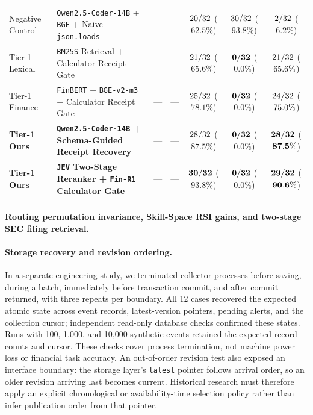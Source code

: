 \begin{table}[t]
{\begin{tabular}{@{}llccccc@{}}
Negative Control & \texttt{Qwen2.5-Coder-14B} + \texttt{BGE} + Naive \texttt{json.loads} & --- & --- & $20/32$ ($62.5\%$) & $30/32$ ($93.8\%$) & $2/32$ ($6.2\%$) \\
Tier-1 Lexical & \texttt{BM25S} Retrieval + Calculator Receipt Gate & --- & --- & $21/32$ ($65.6\%$) & $\mathbf{0/32}$ ($\mathbf{0.0\%}$) & $21/32$ ($65.6\%$) \\
Tier-1 Finance & \texttt{FinBERT} + \texttt{BGE-v2-m3} + Calculator Receipt Gate & --- & --- & $25/32$ ($78.1\%$) & $\mathbf{0/32}$ ($\mathbf{0.0\%}$) & $24/32$ ($75.0\%$) \\
\textbf{Tier-1 Ours} & \textbf{\texttt{Qwen2.5-Coder-14B} + Schema-Guided Receipt Recovery} & --- & --- & $28/32$ ($87.5\%$) & $\mathbf{0/32}$ ($\mathbf{0.0\%}$) & $\mathbf{28/32}$ ($\mathbf{87.5\%}$) \\
\textbf{Tier-1 Ours} & \textbf{\texttt{JEV} Two-Stage Reranker + \texttt{Fin-R1} Calculator Gate} & --- & --- & $\mathbf{30/32}$ ($\mathbf{93.8\%}$) & $\mathbf{0/32}$ ($\mathbf{0.0\%}$) & $\mathbf{29/32}$ ($\mathbf{90.6\%}$) \\
\bottomrule
\end{tabular}%
}
\end{table}

\paragraph{Routing permutation invariance, Skill-Space RSI gains, and two-stage SEC filing retrieval.}
\paragraph{Storage recovery and revision ordering.}
In a separate engineering study, we terminated collector processes before saving,
during a batch, immediately before transaction commit, and after commit returned,
with three repeats per boundary. All 12 cases recovered the expected atomic state
across event records, latest-version pointers, pending alerts, and the collection
cursor; independent read-only database checks confirmed these states. Runs with
100, 1,000, and 10,000 synthetic events retained the expected record counts and
cursor. These checks cover process termination, not machine power loss or financial
task accuracy. An out-of-order revision test also exposed an interface boundary:
the storage layer's \texttt{latest} pointer follows arrival order, so an older
revision arriving last becomes current. Historical research must therefore apply
an explicit chronological or availability-time selection policy rather than infer
publication order from that pointer.

